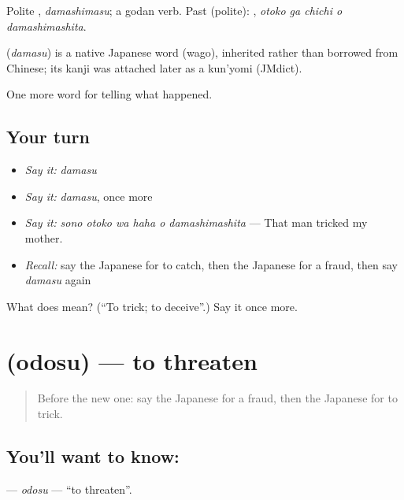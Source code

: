 Polite \textbf{}, \emph{damashimasu}; a godan verb. Past (polite): \textbf{  }, \emph{otoko ga chichi o damashimashita}.

\begin{cousinweb}
\textbf{} (\emph{damasu}) is a native Japanese word (wago), inherited rather than borrowed from Chinese; its kanji was attached later as a kun'yomi (JMdict).
\end{cousinweb}

\begin{grammarlens}[title={What you've built}]
One more word for telling what happened.
\end{grammarlens}

\subsection*{Your turn}
\begin{itemize}
\raggedright
  \item \emph{Say it:} \emph{damasu}
  \item \emph{Say it:} \emph{damasu}, once more
  \item \emph{Say it:} \emph{sono otoko wa haha o damashimashita} — That man tricked my mother.
  \item \emph{Recall:} say the Japanese for to catch, then the Japanese for a fraud, then say \emph{damasu} again
\end{itemize}

\begin{tcolorbox}[breakable,colback=teal!4,colframe=teal!35!black,title={Before you move on}]
What does  mean? (\textquotedblleft{}To trick; to deceive\textquotedblright{}.) Say it once more.
\end{tcolorbox}
\section[\texorpdfstring{\ja{おどす} (odosu)}{おどす (odosu)}]{ (odosu) — to threaten}

\label{lesson:JA-C272-odosu}



\begin{quote}
Before the new one: say the Japanese for a fraud, then the Japanese for to trick.
\end{quote}

\subsection*{You'll want to know: }
\textbf{} — \emph{odosu} — \textquotedblleft{}to threaten\textquotedblright{}.

